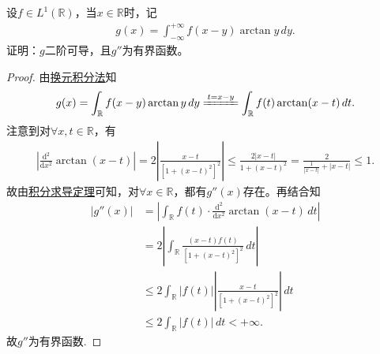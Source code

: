 \documentclass[../../main.tex]{subfiles}%
\begin{document}
\begin{example}
设$f\in L^1(\mathbb{R})$，当$x\in\mathbb{R}$时，记
\begin{align*}
g(x) = \int_{-\infty}^{+\infty} f(x-y) \arctan y \, dy.
\end{align*}
证明：$g$二阶可导，且$g''$为有界函数。
\end{example}
\begin{proof}
由\hyperref[theorem:实变函数--换元积分法]{换元积分法}知
\begin{align*}
g(x) = \int_{\mathbb{R}} f(x-y) \arctan y \, dy \xlongequal{t=x-y} \int_{\mathbb{R}} f(t) \arctan(x-t) \, dt.
\end{align*}
注意到对$\forall x,t\in\mathbb{R}$，有
\begin{align*}
\left| \frac{\mathrm{d}^2}{\mathrm{d}x^2} \arctan(x-t) \right|
= 2\left| \frac{x-t}{\left[1+(x-t)^2\right]^2} \right|
\leqslant \frac{2|x-t|}{1+(x-t)^2}
= \frac{2}{\frac{1}{|x-t|} + |x-t|}
\leqslant 1.
\end{align*}
故由\hyperref[theorem:积分求导定理]{积分求导定理}可知，对$\forall x\in\mathbb{R}$，都有$g''(x)$存在。再结合知
\begin{align*}
|g''(x)|
&= \left| \int_{\mathbb{R}} f(t) \cdot \frac{\mathrm{d}^2}{\mathrm{d}x^2} \arctan(x-t) \, dt \right| \\
&= 2\left| \int_{\mathbb{R}} \frac{(x-t)f(t)}{\left[1+(x-t)^2\right]^2} \, dt \right| \\
&\leqslant 2 \int_{\mathbb{R}} |f(t)| \left| \frac{x-t}{\left[1+(x-t)^2\right]^2} \right| \, dt \\
&\leqslant 2 \int_{\mathbb{R}} |f(t)| \, dt < +\infty.
\end{align*}
故$g''$为有界函数.
\end{proof}
\end{document}
